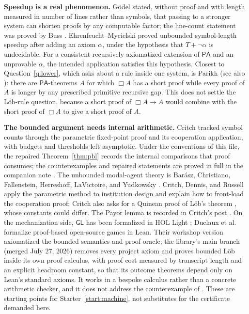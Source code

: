 \documentclass[11pt]{amsart}
\theoremstyle{plain}
\theoremstyle{definition}
\newcommand{\PA}{\mathsf{PA}}
\newcommand{\GL}{\mathsf{GL}}
\begin{document}
\textbf{Speedup is a real phenomenon.} G\"odel \cite{godel1936} stated, without proof and with length measured in number of lines rather than symbols, that passing to a stronger system can shorten proofs by any computable factor; the line-count statement was proved by Buss \cite{buss1994}. Ehrenfeucht--Mycielski \cite{ehrenfeucht1971} proved unbounded symbol-length speedup after adding an axiom $\alpha$, under the hypothesis that $T+\neg\alpha$ is undecidable. For a consistent recursively axiomatized extension of $\PA$ and an unprovable $\alpha$, the intended application satisfies this hypothesis. Closest to Question~\ref{q:lower}, which asks about a rule inside one system, is Parikh \cite{parikh1971} (see also \cite{buss1999}): there are $\PA$-theorems $A$ for which $\Box A$ has a short proof while every proof of $A$ is longer by any prescribed primitive recursive gap. This does not settle the L\"ob-rule question, because a short proof of $\Box A\to A$ would combine with the short proof of $\Box A$ to give a short proof of $A$.

\textbf{The bounded argument needs internal arithmetic.} Critch \cite{critch2016} tracked symbol counts through the parametric fixed-point proof and its cooperation application, with budgets and thresholds left asymptotic. Under the conventions of this file, the repaired Theorem~\ref{thm:pbl} records the internal comparisons that proof consumes; the counterexamples and repaired statements are proved in full in the companion note \cite{sol2026}. The unbounded modal-agent theory is Bar\'asz, Christiano, Fallenstein, Herreshoff, LaVictoire, and Yudkowsky \cite{barasz2014}. Critch, Dennis, and Russell \cite{cdr2022} apply the parametric method to institution design and explain how to front-load the cooperation proof; Critch also asks for a Quinean proof of L\"ob's theorem \cite{critch2022quine}, whose constants could differ. The Payor lemma is recorded in Critch's post \cite{critchpayor2023}. On the mechanization side, $\GL$ has been formalized in HOL Light \cite{maggesi2023}; Duclaux et al.\ \cite{duclaux2026} formalize proof-based open-source games in Lean. Their workshop version axiomatized the bounded semantics and proof oracle; the library's main branch (merged July 27, 2026) removes every project axiom and proves bounded L\"ob inside its own proof calculus, with proof cost measured by transcript length and an explicit headroom constant, so that its outcome theorems depend only on Lean's standard axioms. It works in a bespoke calculus rather than a concrete arithmetic checker, and it does not address the counterexample of \cite{sol2026}. These are starting points for Starter~\ref{start:machine}, not substitutes for the certificate demanded here.
\end{document}
